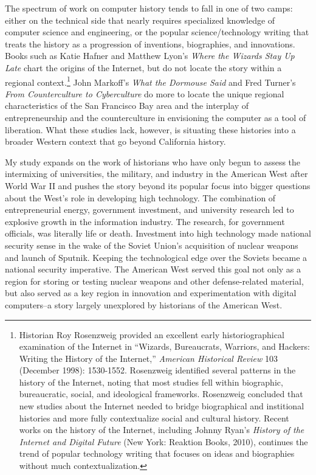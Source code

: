 \documentclass[11pt,article,oneside]{memoir}
\begin{document}
The spectrum of work on computer history tends to fall in one of two
camps: either on the technical side that nearly requires specialized
knowledge of computer science and engineering, or the popular
science/technology writing that treats the history as a progression of
inventions, biographies, and innovations. Books such as Katie Hafner and
Matthew Lyon's \emph{Where the Wizards Stay Up Late} chart the origins
of the Internet, but do not locate the story within a regional
context.\footnote{Historian Roy Rosenzweig provided an excellent early
  historiographical examination of the Internet in ``Wizards,
  Bureaucrats, Warriors, and Hackers: Writing the History of the
  Internet,'' \emph{American Historical Review} 103 (December 1998):
  1530-1552. Rosenzweig identified several patterns in the history of
  the Internet, noting that most studies fell within biographic,
  bureaucratic, social, and ideological frameworks. Rosenzweig concluded
  that new studies about the Internet needed to bridge biographical and
  institional histories and more fully contextualize social and cultural
  history. Recent works on the history of the Internet, including Johnny
  Ryan's \emph{History of the Internet and Digital Future} (New York:
  Reaktion Books, 2010), continues the trend of popular technology
  writing that focuses on ideas and biographies without much
  contextualization.} John Markoff's \emph{What the Dormouse Said} and
Fred Turner's \emph{From Counterculture to Cyberculture} do more to
locate the unique regional characteristics of the San Francisco Bay area
and the interplay of entrepreneurship and the counterculture in
envisioning the computer as a tool of liberation. What these studies
lack, however, is situating these histories into a broader Western
context that go beyond California history.

My study expands on the work of historians who have only begun to assess
the intermixing of universities, the military, and industry in the
American West after World War II and pushes the story beyond its popular
focus into bigger questions about the West's role in developing high
technology. The combination of entrepreneurial energy, government
investment, and university research led to explosive growth in the
information industry. The research, for government officials, was
literally life or death. Investment into high technology made national
security sense in the wake of the Soviet Union's acquisition of nuclear
weapons and launch of Sputnik. Keeping the technological edge over the
Soviets became a national security imperative. The American West served
this goal not only as a region for storing or testing nuclear weapons
and other defense-related material, but also served as a key region in
innovation and experimentation with digital computers--a story largely
unexplored by historians of the American West.
\end{document}
